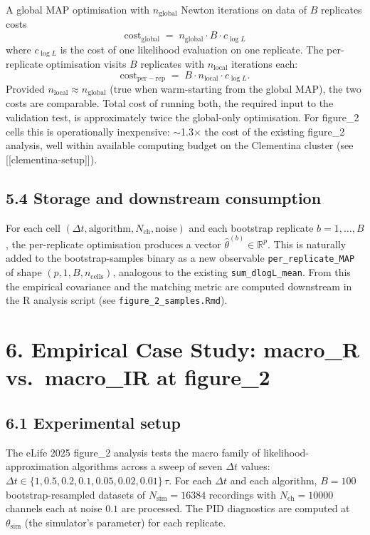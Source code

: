 \documentclass[11pt]{article}
\begin{document}
A global MAP optimisation with $n_{\mathrm{global}}$ Newton iterations
on data of $B$ replicates costs
\[
\text{cost}_{\mathrm{global}}
\;=\;
n_{\mathrm{global}}\cdot B\cdot c_{\log L}
\]
where $c_{\log L}$ is the cost of one likelihood evaluation on one
replicate. The per-replicate optimisation visits $B$ replicates with
$n_{\mathrm{local}}$ iterations each:
\[
\text{cost}_{\mathrm{per-rep}}
\;=\;
B\cdot n_{\mathrm{local}}\cdot c_{\log L}.
\]
Provided $n_{\mathrm{local}}\approx n_{\mathrm{global}}$ (true when
warm-starting from the global MAP), the two costs are comparable. Total
cost of running both, the required input to the validation test, is
approximately twice the global-only optimisation. For figure\_2 cells
this is operationally inexpensive: $\sim$1.3$\times$ the cost of the
existing figure\_2 analysis, well within available computing budget on
the Clementina cluster (see [[clementina-setup]]).

\subsection*{5.4 Storage and downstream consumption}

For each cell $(\Delta t, \mathrm{algorithm}, N_{\mathrm{ch}}, \mathrm{noise})$
and each bootstrap replicate $b = 1,\ldots,B$, the per-replicate
optimisation produces a vector $\widehat\theta^{(b)}\in\mathbb R^p$.
This is naturally added to the bootstrap-samples binary as a new
observable
\texttt{per\_replicate\_MAP} of shape $(p, 1, B, n_{\mathrm{cells}})$,
analogous to the existing \texttt{sum\_dlogL\_mean}. From this the
empirical covariance and the matching metric are computed downstream
in the R analysis script (see \texttt{figure\_2\_samples.Rmd}).

\section*{6. Empirical Case Study: macro\_R vs.\ macro\_IR at figure\_2}
\label{sec:av-empirical-case}

\subsection*{6.1 Experimental setup}

The eLife 2025 figure\_2 analysis tests the macro family of
likelihood-approximation algorithms across a sweep of seven $\Delta t$
values:
$\Delta t \in \{1, 0.5, 0.2, 0.1, 0.05, 0.02, 0.01\}\,\tau$. For each
$\Delta t$ and each algorithm, $B = 100$ bootstrap-resampled datasets
of $N_{\mathrm{sim}} = 16384$ recordings with $N_{\mathrm{ch}} = 10000$
channels each at noise $0.1$ are processed. The PID diagnostics are
computed at $\theta_{\mathrm{sim}}$ (the simulator's parameter) for each
replicate.
\end{document}
